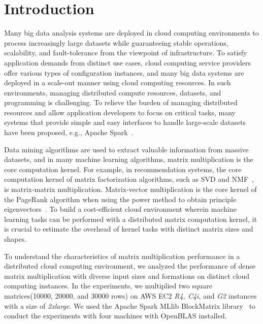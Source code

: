 \documentclass[10pt, conference, compsocconf]{IEEEtran}
\begin{document}
\IEEEpeerreviewmaketitle

\section{Introduction}\label{sec:intro}
Many big data analysis systems are deployed in cloud computing environments to process increasingly large datasets while guaranteeing stable operations, scalability, and fault-tolerance from the viewpoint of infrastructure. To satisfy application demands from distinct use cases, cloud computing service providers offer various types of configuration instances, and many big data systems are deployed in a scale-out manner using cloud computing resources. In such environments, managing distributed compute resources, datasets, and programming is challenging. To relieve the burden of managing distributed resources and allow application developers to focus on critical tasks, many systems that provide simple and easy interfaces to handle large-scale datasets have been proposed, e.g., Apache Spark~\cite{spark}.

Data mining algorithms are used to extract valuable information from massive datasets, and in many machine learning algorithms, matrix multiplication is the core computation kernel. For example, in recommendation systems, the core computation kernel of matrix factorization algorithms, such as SVD and NMF~\cite{nmf}, is matrix-matrix multiplication. Matrix-vector multiplication is the core kernel of the PageRank algorithm when using the power method to obtain principle eigenvectors~\cite{pagerank}. To build a cost-efficient cloud environment wherein machine learning tasks can be performed with a distributed matrix computation kernel, it is crucial to estimate the overhead of kernel tasks with distinct matrix sizes and shapes.

To understand the characteristics of matrix multiplication performance in a distributed cloud computing environment, we analyzed the performance of dense matrix multiplication with diverse input sizes and formations on distinct cloud computing instances. In the experiments, we multiplied two square matrices(10000, 20000, and 30000 rows) on AWS EC2 \textit{R4, C4i}, and \textit{G2} instances with a size of \textit{2xlarge}. We used the Apache Spark MLlib BlockMatrix library~\cite{spark-mm} to conduct the experiments with four machines with OpenBLAS installed.
\end{document}
